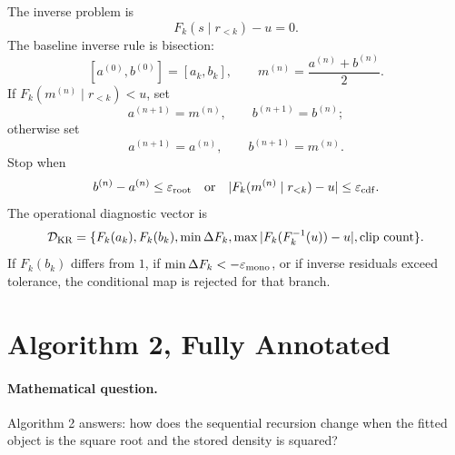 \documentclass[11pt]{article}
\begin{document}
The inverse problem is
\[
    F_k(s\mid r_{<k})-u=0.
    \label{eq:p24-p23-krops5}
\]
The baseline inverse rule is bisection:
\[
    [a^{(0)},b^{(0)}]=[a_k,b_k],
    \qquad
    m^{(n)}=\frac{a^{(n)}+b^{(n)}}2.
    \label{eq:p24-p23-krops6}
\]
If \(F_k(m^{(n)}\mid r_{<k})<u\), set
\[
    a^{(n+1)}=m^{(n)},\qquad b^{(n+1)}=b^{(n)};
    \label{eq:p24-p23-krops7}
\]
otherwise set
\[
    a^{(n+1)}=a^{(n)},\qquad b^{(n+1)}=m^{(n)}.
    \label{eq:p24-p23-krops8}
\]
Stop when
\[
    b^{(n)}-a^{(n)}\le \varepsilon_{\rm root}
    \quad\text{or}\quad
    |F_k(m^{(n)}\mid r_{<k})-u|\le \varepsilon_{\rm cdf}.
    \label{eq:p24-p23-krops9}
\]
The operational diagnostic vector is
\[
    \mathcal D_{\rm KR}
    =
    \{F_k(a_k),F_k(b_k),\min\Delta F_k,
      \max|F_k(F_k^{-1}(u))-u|,\text{clip count}\}.
    \label{eq:p24-p23-krops10}
\]
If \(F_k(b_k)\) differs from \(1\), if \(\min\Delta F_k<-\varepsilon_{\rm mono}\),
or if inverse residuals exceed tolerance, the conditional map is rejected for
that branch.

\begin{center}
\end{center}

\section{Algorithm 2, Fully Annotated}

\paragraph{Mathematical question.}
Algorithm 2 answers: how does the sequential recursion change when the fitted
object is the square root and the stored density is squared?
\end{document}
